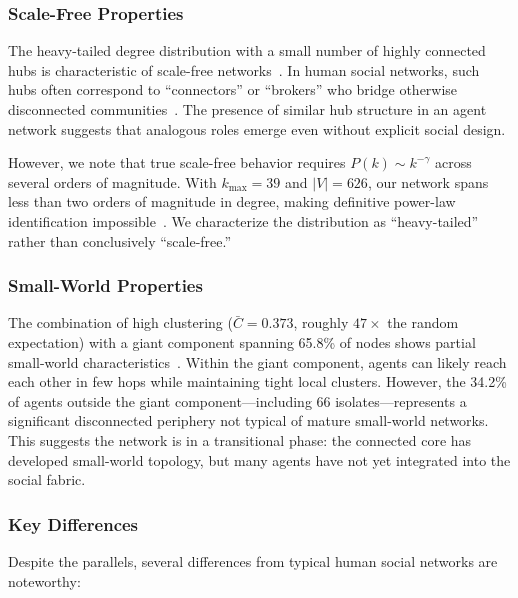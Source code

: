 \documentclass[11pt,twocolumn]{article}
\begin{document}
\subsubsection{Scale-Free Properties}

The heavy-tailed degree distribution with a small number of highly connected hubs is characteristic of scale-free networks~\citep{barabasi1999emergence}. In human social networks, such hubs often correspond to ``connectors'' or ``brokers'' who bridge otherwise disconnected communities~\citep{burt2004structural}. The presence of similar hub structure in an agent network suggests that analogous roles emerge even without explicit social design.

However, we note that true scale-free behavior requires $P(k) \sim k^{-\gamma}$ across several orders of magnitude. With $k_{\text{max}} = 39$ and $|V| = 626$, our network spans less than two orders of magnitude in degree, making definitive power-law identification impossible~\citep{clauset2009power}. We characterize the distribution as ``heavy-tailed'' rather than conclusively ``scale-free.''

\subsubsection{Small-World Properties}

The combination of high clustering ($\bar{C} = 0.373$, roughly $47\times$ the random expectation) with a giant component spanning 65.8\% of nodes shows partial small-world characteristics~\citep{watts1998collective}. Within the giant component, agents can likely reach each other in few hops while maintaining tight local clusters. However, the 34.2\% of agents outside the giant component---including 66 isolates---represents a significant disconnected periphery not typical of mature small-world networks. This suggests the network is in a transitional phase: the connected core has developed small-world topology, but many agents have not yet integrated into the social fabric.

\subsubsection{Key Differences}

Despite the parallels, several differences from typical human social networks are noteworthy:
\end{document}
